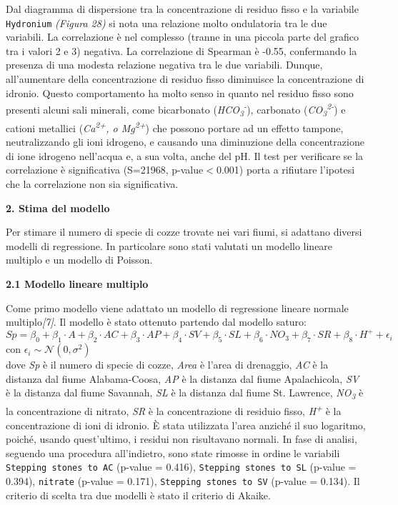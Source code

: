 \documentclass{article} %
\begin{document}
Dal diagramma di dispersione tra la concentrazione di residuo fisso e la variabile \texttt{Hydronium} \textit{(Figura 28)} si nota una relazione molto ondulatoria tra le due variabili.
La correlazione è nel complesso (tranne in una piccola parte del grafico tra i valori 2 e 3) negativa.
La correlazione di Spearman è -0.55, confermando la presenza di una modesta relazione negativa tra le due variabili. Dunque, all'aumentare della concentrazione di residuo fisso diminuisce la concentrazione di idronio.
Questo comportamento ha molto senso in quanto nel residuo fisso sono presenti alcuni sali minerali, come bicarbonato (\textit{HCO\textsubscript{3}\textsuperscript{-}}), carbonato (\textit{CO\textsubscript{3}\textsuperscript{2-}}) e cationi metallici (\textit{Ca\textsuperscript{2+}, o Mg\textsuperscript{2+}}) che possono portare ad un effetto tampone, neutralizzando gli ioni idrogeno, e causando una diminuzione della concentrazione di ione idrogeno nell'acqua e, a sua volta, anche del pH.
Il test per verificare se la correlazione è significativa (S=21968, p-value$<$0.001) porta a rifiutare l'ipotesi che la correlazione non sia significativa.

\begin{flushleft}
    \vskip 30pt
    \textbf{\Huge 2. \: Stima del modello}
    \vskip 10pt
\end{flushleft}

Per stimare il numero di specie di cozze trovate nei vari fiumi, si adattano diversi modelli di regressione. In particolare sono stati valutati un modello lineare multiplo e un modello di Poisson.

\vskip 20pt
\begin{flushleft}
    \textbf{\Large 2.1 \: Modello lineare multiplo}
\end{flushleft}
\vskip 10pt

Come primo modello viene adattato un modello di regressione lineare normale multiplo\textit{[7]}. Il modello è stato ottenuto partendo dal modello saturo: 
\[
Sp =\beta_0+\beta_1 \cdot A+ \beta_2\cdot AC +\beta_3\cdot AP +\beta_4\cdot SV +\beta_5\cdot SL +\beta_6\cdot NO_3 +\beta_7\cdot SR + \beta_8\cdot H^+ +\epsilon_i \quad 
\]
$\text{con } \epsilon_i \sim \mathcal{N}(0,\sigma^2)$\\
dove \textit{Sp} è il numero di specie di cozze, \textit{Area} è l'area di drenaggio, \textit{AC} è la distanza dal fiume Alabama-Coosa, \textit{AP} è la distanza dal fiume Apalachicola, \textit{SV} è la distanza dal fiume Savannah, \textit{SL} è la distanza dal fiume St. Lawrence, \textit{NO\textsubscript{3}} è la concentrazione di nitrato, \textit{SR} è la concentrazione di residuio fisso, \textit{H\textsuperscript{+}} è la concentrazione di ioni di idronio.
È stata utilizzata l'area anziché il suo logaritmo, poiché, usando quest'ultimo, i residui non risultavano normali.
In fase di analisi, seguendo una procedura all'indietro, sono state rimosse in ordine le variabili \texttt{Stepping stones to AC} (p-value = 0.416), \texttt{Stepping stones to SL} (p-value = 0.394), \texttt{nitrate} (p-value = 0.171),   \texttt{Stepping stones to SV} (p-value = 0.134). Il criterio di scelta tra due modelli è stato il criterio di Akaike.
\end{document}
